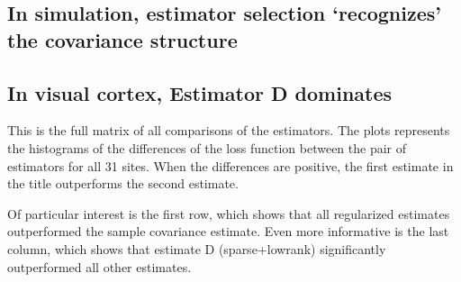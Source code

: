 

\subsection*{In simulation, estimator selection `recognizes' the covariance structure}


\subsection*{In visual cortex, Estimator D dominates}

This is the full matrix of all comparisons of the estimators.  The plots represents the histograms of the differences of the loss function between the pair of estimators for all 31 sites.  When the differences are positive, the first estimate in the title outperforms the second estimate.

Of particular interest is the first row, which shows that all regularized estimates  outperformed the sample covariance estimate.  Even more informative is the last column, which shows that estimate D (sparse+lowrank) significantly outperformed all other estimates.



